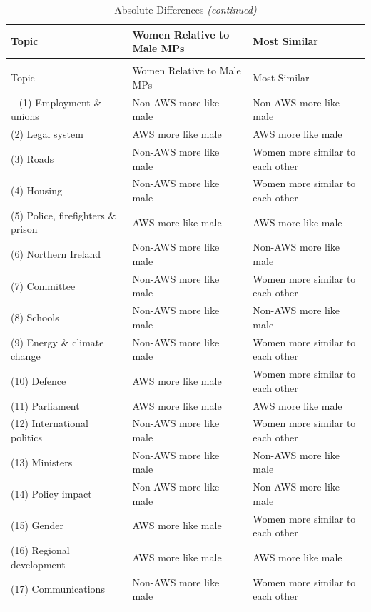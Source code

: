 \documentclass[]{article}
\theoremstyle{definition}
\theoremstyle{definition}
\theoremstyle{definition}
\theoremstyle{remark}
\begin{document}
\begin{table}[H]
\begin{table}[H]
\begin{table}[H]
\begin{table}[H]
\begin{table}[H]
\begin{table}[H]
\begin{table}[H]
\begin{table}[H]
\begin{longtabu} to 
\caption{\label{tab:absolute-differences}Absolute Differences}\\
\toprule
Topic & Women Relative to Male MPs & Most Similar\\
\midrule
\endfirsthead
\caption[]{\label{tab:absolute-differences}Absolute Differences \textit{(continued)}}\\
\toprule
Topic & Women Relative to Male MPs & Most Similar\\
\midrule
\endhead
\
\endfoot
\bottomrule
\endlastfoot
(1) Employment \& unions & Non-AWS more like male & Non-AWS more like male\\
(2) Legal system & AWS more like male & AWS more like male\\
(3) Roads & Non-AWS more like male & Women more similar to each other\\
(4) Housing & Non-AWS more like male & Women more similar to each other\\
(5) Police, firefighters \& prison & AWS more like male & AWS more like male\\
\addlinespace
(6) Northern Ireland & Non-AWS more like male & Non-AWS more like male\\
(7) Committee & Non-AWS more like male & Women more similar to each other\\
(8) Schools & Non-AWS more like male & Non-AWS more like male\\
(9) Energy \& climate change & Non-AWS more like male & Women more similar to each other\\
(10) Defence & AWS more like male & Women more similar to each other\\
\addlinespace
(11) Parliament & AWS more like male & AWS more like male\\
(12) International politics & Non-AWS more like male & Women more similar to each other\\
(13) Ministers & Non-AWS more like male & Non-AWS more like male\\
(14) Policy impact & Non-AWS more like male & Non-AWS more like male\\
(15) Gender & AWS more like male & Women more similar to each other\\
\addlinespace
(16) Regional development & AWS more like male & AWS more like male\\
(17) Communications & Non-AWS more like male & Women more similar to each other\\

\end{longtabu}
\end{table}
\end{table}
\end{table}
\end{table}
\end{table}
\end{table}
\end{table}
\end{table}
\end{document}
